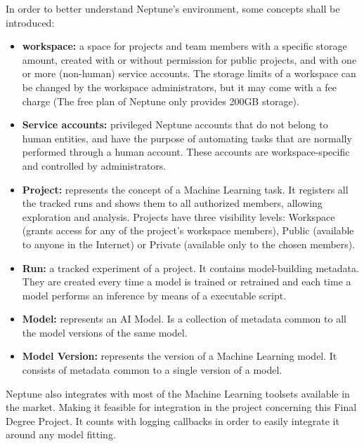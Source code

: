 In order to better understand Neptune's environment, some concepts shall be introduced:

\begin{itemize}
    \item \textbf{workspace: }a space for projects and team members with a specific storage amount, created with or without permission for public projects, and with one 
    or more (non-human) service accounts. The storage limits of a workspace can be changed by the workspace administrators, but it may come with a fee charge (The free
    plan of Neptune only provides 200GB storage).

    \item \textbf{Service accounts: }privileged Neptune accounts that do not belong to human entities, and have the purpose of automating tasks that are normally performed
    through a human account. These accounts are workspace-specific and controlled by administrators.

    \item \textbf{Project: }represents the concept of a Machine Learning task. It registers all the tracked runs and shows them to all authorized members, allowing exploration and 
    analysis. Projects have three visibility levels: Workspace (grants access for any of the project's workspace members), Public (available to anyone in the Internet)
    or Private (available only to the chosen members).

    \item \textbf{Run: }a tracked experiment of a project. It contains model-building metadata. They are created every time a model is trained or retrained and
    each time a model performs an inference by means of a executable script.

    \item \textbf{Model: } represents an \acrshort{AI} Model. Is a collection of metadata common to all the model versions of the same model.

    \item \textbf{Model Version: } represents the version of a Machine Learning model. It consists of metadata common to a single version of a model.

\end{itemize}

Neptune also integrates with most of the Machine Learning toolsets available in the market. Making it feasible for integration in the project concerning this Final
Degree Project. It counts with logging callbacks in order to easily integrate it around any model fitting.

